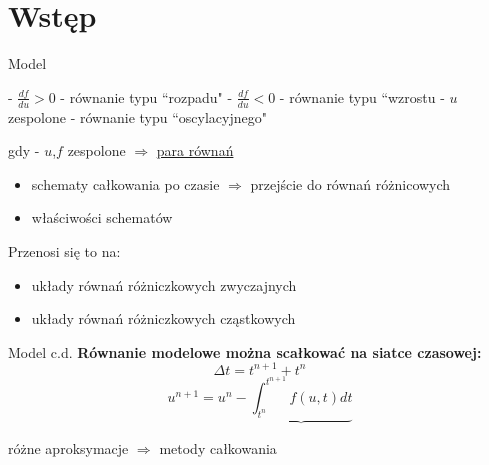 \section{Wstęp}
\begin{frame}{Model}
  \begin{center}
  \end{center}

  - $\frac{df}{du} > 0$ - równanie typu ``rozpadu" \newline
  - $\frac{df}{du} < 0$ - równanie typu ``wzrostu \newline
  - $u$ zespolone - równanie typu ``oscylacyjnego" \par
  \qquad\qquad gdy - $u$,$f$ zespolone $\Rightarrow$ \underline{para równań} \newline
  \begin{itemize}
    \item schematy całkowania po czasie $\Rightarrow$ przejście do równań różnicowych
    \item właściwości schematów
  \end{itemize}
  Przenosi się to na:
  \begin{itemize}
    \item układy równań różniczkowych zwyczajnych
    \item układy równań różniczkowych cząstkowych
  \end{itemize}
\end{frame}
\begin{frame}{Model c.d.}
  \textbf{Równanie modelowe można scałkować na siatce czasowej:}
  $$\Delta t = t^{n+1}+t^n$$
  $$u^{n+1} = u^n - \underbrace{\int_{t^n}^{t^{n+1}}f(u,t)dt}$$
  \begin{flushright}
    różne aproksymacje $\Rightarrow$ metody całkowania
  \end{flushright}
\end{frame}
